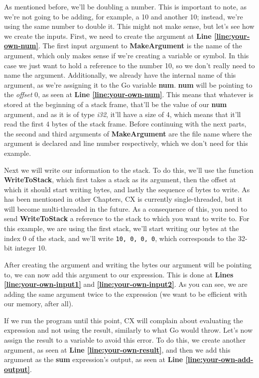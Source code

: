 \documentclass[11pt,fleqn,openany]{book} %
\begin{document}
As mentioned before, we'll be doubling a number. This is important to note, as we're not going to be adding, for example, a 10 and another 10; instead, we're using the same number to double it. This might not make sense, but let's see how we create the inputs. First, we need to create the argument at \textbf{Line \ref{line:your-own-num}}. The first input argument to \textbf{MakeArgument} is the name of the argument, which only makes sense if we're creating a variable or symbol. In this case we just want to hold a reference to the number 10, so we don't really need to name the argument. Additionally, we already have the internal name of this argument, as we're assigning it to the Go variable \textbf{num}. \textbf{num} will be pointing to the \emph{offset} 0, as seen at \textbf{Line \ref{line:your-own-num}}. This means that whatever is stored at the beginning of a stack frame, that'll be the value of our \textbf{num} argument, and as it is of type \emph{i32}, it'll have a size of 4, which means that it'll read the first 4 bytes of the stack frame. Before continuing with the next parts, the second and third arguments of \textbf{MakeArgument} are the file name where the argument is declared and line number respectively, which we don't need for this example.

Next we will write our information to the stack. To do this, we'll use the function \textbf{WriteToStack}, which first takes a stack as its argument, then the offset at which it should start writing bytes, and lastly the sequence of bytes to write. As has been mentioned in other Chapters, CX is currently single-threaded, but it will become multi-threaded in the future. As a consequence of this, you need to send \textbf{WriteToStack} a reference to the stack to which you want to write to. For this example, we are using the first stack, we'll start writing our bytes at the index 0 of the stack, and we'll write \lstinline{10, 0, 0, 0}, which corresponds to the 32-bit integer 10.

After creating the argument and writing the bytes our argument will be pointing to, we can now add this argument to our expression. This is done at \textbf{Lines \ref{line:your-own-input1}} and \textbf{\ref{line:your-own-input2}}. As you can see, we are adding the same argument twice to the expression (we want to be efficient with our memory, after all).

If we run the program until this point, CX will complain about evaluating the expression and not using the result, similarly to what Go would throw. Let's now assign the result to a variable to avoid this error. To do this, we create another argument, as seen at \textbf{Line \ref{line:your-own-result}}, and then we add this argument as the \textbf{sum} expression's output, as seen at \textbf{Line \ref{line:your-own-add-output}}.
\end{document}
